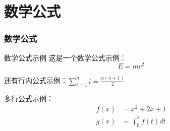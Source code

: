 
\section{数学公式}
\begin{frame}
\frametitle{数学公式}

\begin{block}{数学公式示例}
这是一个数学公式示例：
\[ E = mc^2 \]

还有行内公式示例：$\sum_{i=1}^{n} i = \frac{n(n+1)}{2}$

多行公式示例：
\begin{align}
  f(x) &= x^2 + 2x + 1 \\
  g(x) &= \int_0^x f(t) dt
\end{align}

\end{block}

\end{frame}